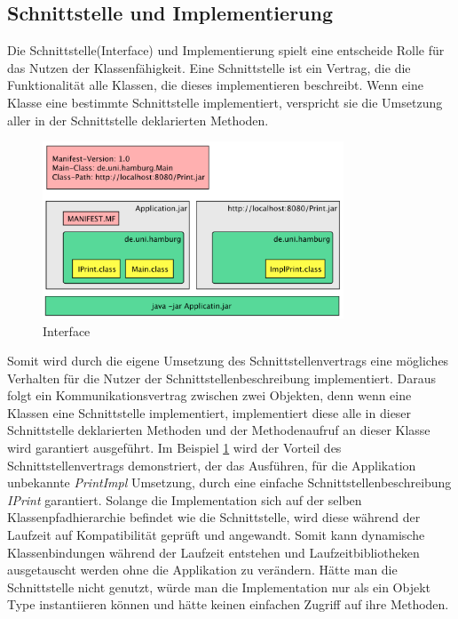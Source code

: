 \subsection{Schnittstelle und Implementierung} %
\label{sub:Schnittstelle und Implementierung}
Die Schnittstelle(Interface) und Implementierung spielt eine entscheide Rolle für das Nutzen der Klassenfähigkeit.
Eine Schnittstelle ist ein Vertrag, die die Funktionalität alle Klassen, die dieses implementieren beschreibt. 
Wenn eine Klasse eine bestimmte Schnittstelle implementiert, verspricht sie die Umsetzung aller in der Schnittstelle deklarierten Methoden. 
\begin{figure}[h!]
  \centering
  \includegraphics[width=0.8\textwidth]{material/images/Interface.png}
  \caption{Interface}
  \label{fig:Interface}
\end{figure}
\newline
Somit wird durch die eigene Umsetzung des Schnittstellenvertrags eine mögliches Verhalten für die Nutzer der Schnittstellenbeschreibung implementiert. 
Daraus folgt ein Kommunikationsvertrag zwischen zwei Objekten, denn wenn eine Klassen eine Schnittstelle implementiert, implementiert diese alle in dieser Schnittstelle deklarierten Methoden und der Methodenaufruf an dieser Klasse wird garantiert ausgeführt. 
\newline
Im Beispiel \ref{fig:Interface} wird der Vorteil des Schnittstellenvertrags demonstriert, der das Ausführen, für die Applikation unbekannte \textit{PrintImpl} Umsetzung, durch eine einfache Schnittstellenbeschreibung \textit{IPrint} garantiert. Solange die Implementation sich auf der selben Klassenpfadhierarchie befindet wie die Schnittstelle, wird diese während der Laufzeit auf Kompatibilität geprüft und angewandt. Somit kann dynamische Klassenbindungen während der Laufzeit entstehen und Laufzeitbibliotheken ausgetauscht werden ohne die Applikation zu verändern. Hätte man die Schnittstelle nicht genutzt, würde man die Implementation nur als ein Objekt Type instantiieren können und hätte keinen einfachen Zugriff auf ihre Methoden.  


